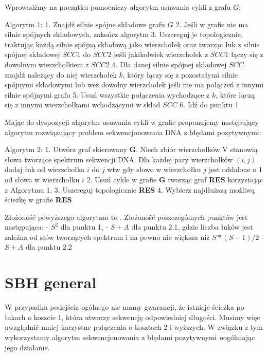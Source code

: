 \documentclass[a4paper]{article}
\begin{document}
Wprowadźmy na początku pomocniczy algorytm usuwania cykli z grafu $G$:

Algorytm 1:
1. Znajdź silnie spójne składowe grafu $G$
2. Jeśli w grafie nie ma silnie spójnych składowych, zakończ algorytm
3. Uszereguj je topologicznie, traktując każdą silnie spójną składową jako wierzchołek oraz tworząc łuk z silnie spójnej składowej $SCC1$ do $SCC2$ jeśli jakikolwiek wierzchołek z $SCC1$ łączy się z dowolnym wierzchołkiem z $SCC2$
4. Dla danej silnie spójnej składowej $SCC$ znajdź należący do niej wierzchołek $k$, który łączy się z pozostałymi silnie spójnymi składowymi lub weź dowolny wierzchołek jeśli nie ma połączeń z innymi silnie spójnymi grafu
5. Usuń wszystkie połączenia wychodzące z $k$, które łączą się z innymi wierzchołkami wchodzącymi w skład $SCC$
6. Idź do punktu 1

Mając do dyspozycji algorytm usuwania cykli w grafie proponujemy następujący algorytm rozwiązujący problem sekwencjonowania DNA z błędami pozytywnymi:

Algorytm 2:
1. Utwórz graf skierowany {\bf G}. Niech zbiór wierzchołków V stanowią słowa tworzące spektrum sekwencji DNA. Dla każdej pary wierzchołków $(i,j)$ dodaj łuk od wierzchołka $i$ do $j$ wtw gdy słowo w wierzchołku $j$ jest oddalone o 1 od słowa w wierzchołku $i$
2. Usuń cykle w grafie {\bf G} tworząc graf {\bf RES} korzystając z Algorytmu 1.
3. Uszereguj topologicznie {\bf RES}
4. Wybierz najdłuższą możliwą ścieżkę w grafie {\bf RES}

Złożoność powyższego algorytmu to $ $. Złożoność poszczególnych punktów jest następująca:
- $S^2$ dla punktu 1,
- $S + A$ dla punktu 2.1, gdzie liczba łuków jest zależna od słów tworzących spektrum i na pewno nie większa niż $S * (S-1) / 2$
- $S + A$ dla punktu 2.2

\section{SBH general}
W przypadku podejścia ogólnego nie mamy gwarancji, że istnieje ścieżka po łukach o koszcie 1, która utworzy sekwencję odpowiedniej długości. Musimy więc uwzględnić mniej korzystne połączenia o kosztach 2 i wyższych. W związku z tym wykorzystamy algorytm sekwencjonowania z błędami pozytywnymi uogólniając jego działanie.
\end{document}
